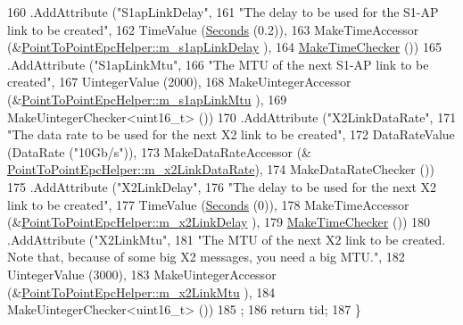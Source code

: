 \begin{DoxyCode}
160     .AddAttribute (\textcolor{stringliteral}{"S1apLinkDelay"}, 
161                    \textcolor{stringliteral}{"The delay to be used for the S1-AP link to be created"},
162                    TimeValue (\hyperlink{group__timecivil_ga33c34b816f8ff6628e33d5c8e9713b9e}{Seconds} (0.2)),
163                    MakeTimeAccessor (&\hyperlink{classns3_1_1PointToPointEpcHelper_aa396ad3f7fa4f88cea85ffc61481afb1}{PointToPointEpcHelper::m\_s1apLinkDelay}
      ),
164                    \hyperlink{group__time_ga7032965bd4afa578691d88c09e4481c1}{MakeTimeChecker} ())
165     .AddAttribute (\textcolor{stringliteral}{"S1apLinkMtu"}, 
166                    \textcolor{stringliteral}{"The MTU of the next S1-AP link to be created"},
167                    UintegerValue (2000),
168                    MakeUintegerAccessor (&\hyperlink{classns3_1_1PointToPointEpcHelper_a1ca7acd9a9e782276d5580fd48bcda72}{PointToPointEpcHelper::m\_s1apLinkMtu}
      ),
169                    MakeUintegerChecker<uint16\_t> ())
170     .AddAttribute (\textcolor{stringliteral}{"X2LinkDataRate"},
171                    \textcolor{stringliteral}{"The data rate to be used for the next X2 link to be created"},
172                    DataRateValue (DataRate (\textcolor{stringliteral}{"10Gb/s"})),
173                    MakeDataRateAccessor (&
      \hyperlink{classns3_1_1PointToPointEpcHelper_a4f9ea604fa9ce578c054beb863f930b0}{PointToPointEpcHelper::m\_x2LinkDataRate}),
174                    MakeDataRateChecker ())
175     .AddAttribute (\textcolor{stringliteral}{"X2LinkDelay"},
176                    \textcolor{stringliteral}{"The delay to be used for the next X2 link to be created"},
177                    TimeValue (\hyperlink{group__timecivil_ga33c34b816f8ff6628e33d5c8e9713b9e}{Seconds} (0)),
178                    MakeTimeAccessor (&\hyperlink{classns3_1_1PointToPointEpcHelper_a93bb73393a99dc8f2f03a0e7e3b38fa0}{PointToPointEpcHelper::m\_x2LinkDelay}
      ),
179                    \hyperlink{group__time_ga7032965bd4afa578691d88c09e4481c1}{MakeTimeChecker} ())
180     .AddAttribute (\textcolor{stringliteral}{"X2LinkMtu"},
181                    \textcolor{stringliteral}{"The MTU of the next X2 link to be created. Note that, because of some big X2 messages,
       you need a big MTU."},
182                    UintegerValue (3000),
183                    MakeUintegerAccessor (&\hyperlink{classns3_1_1PointToPointEpcHelper_af2fe6768a3a0a75321562f01d2abff2d}{PointToPointEpcHelper::m\_x2LinkMtu}
      ),
184                    MakeUintegerChecker<uint16\_t> ())
185   ;
186   \textcolor{keywordflow}{return} tid;
187 \}
\end{DoxyCode}


